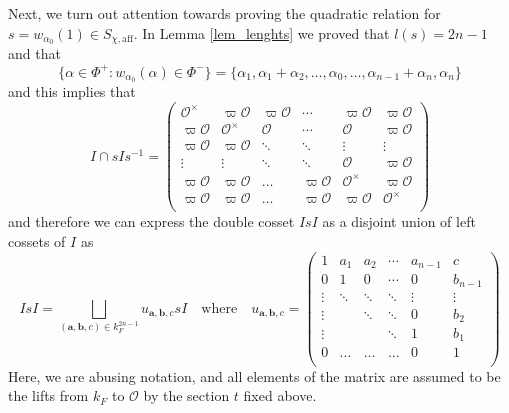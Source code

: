 \documentclass{article}
\newcommand{\aff}{\mathrm{aff}}
\newcommand{\cO}{\mathcal{O}}
\theoremstyle{plain}
\theoremstyle{definition}
\begin{document}
    \newpage
    Next, we turn out attention towards proving the quadratic relation for $s=w_{\alpha_0}(1)\in S_{\chi,\aff}$. In Lemma \ref{lem_lenghts} we proved that $l(s)=2n-1$ and that 
    $$\{\alpha\in\Phi^+:w_{\alpha_0}(\alpha)\in\Phi^-\}=\{\alpha_1,\alpha_1+\alpha_2,\ldots,\alpha_0,\ldots,\alpha_{n-1}+\alpha_n,\alpha_n\}$$
    and this implies that
    \begin{equation*}
        I\cap sI s^{-1}=\begin{pmatrix}
            \cO^\times&\varpi\cO&\varpi\cO&\cdots&\varpi\cO&\varpi\cO\\
            \varpi\cO&\cO^\times&\cO&\cdots&\cO&\varpi\cO\\
            \varpi\cO&\varpi\cO&\ddots&\ddots&\vdots&\vdots\\
            \vdots&\vdots&\ddots&\ddots&\cO&\varpi\cO\\
            \varpi\cO&\varpi\cO&\ldots&\varpi\cO&\cO^\times&\varpi\cO\\
           \varpi\cO&\varpi\cO&\ldots&\varpi\cO&\varpi\cO&\cO^\times\\
        \end{pmatrix}
    \end{equation*}
    and therefore we can express the double cosset $IsI$ as a disjoint union of left cossets of $I$ as
    \begin{equation*}
        IsI=\bigsqcup_{(\mathbf{a},\mathbf{b},c)\in k_F^{2n-1}}u_{\mathbf{a},\mathbf{b},c}sI\quad\text{where}\quad u_{\mathbf{a},\mathbf{b},c}=\begin{pmatrix}
            1&a_1&a_2&\cdots&a_{n-1}&c\\
            0&1&0&\cdots&0&b_{n-1}\\
            \vdots&\ddots&\ddots&\ddots&\vdots&\vdots\\
            \vdots&&\ddots&\ddots&0&b_2\\
            \vdots&&&\ddots&1&b_1\\
            0&\ldots&\ldots&\ldots&0&1\\
        \end{pmatrix}
    \end{equation*}
    Here, we are abusing notation, and all elements of the matrix are assumed to be the lifts from $k_F$ to $\cO$ by the section $t$ fixed above.
\end{document}

